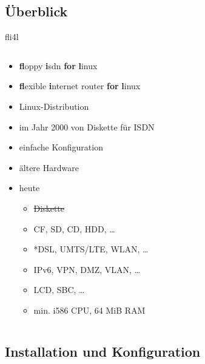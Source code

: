 \documentclass[t]{beamer}
\makeatletter
\newcommand{\soutthick}[1]{%
    \renewcommand{\ULthickness}{1pt}%
        \sout{#1}%
    \renewcommand{\ULthickness}{.4pt}%
}
\newcommand{\strong}[1]{\@strong{#1}}
\newcommand{\@@strong}[1]{\textbf{\let\@strong\@@@strong#1}}
\newcommand{\@@@strong}[1]{\textnormal{\let\@strong\@@strong#1}}
\let\@strong\@@strong
\makeatother
\begin{document}
\subsection{Überblick}

\begin{frame}{fli4l}
    \begin{columns}[T,onlytextwidth]
        \begin{column}{0.6\textwidth}
            \begin{itemize}
                \item \strong{fl}oppy \strong{i}sdn \strong{for} \strong{l}inux
                \item \strong{fl}exible \strong{i}nternet router \strong{for}
                    \strong {l}inux
                \item<2-> Linux-Distribution
                \item<2-> im Jahr 2000 von Diskette für ISDN
                \item<2-> einfache Konfiguration
                \item<2-> ältere Hardware
                \item<3-> heute
                    \begin{itemize}
                        \item \soutthick{Diskette}
                        \item CF, SD, CD, HDD, …
                        \item *DSL, UMTS/LTE, WLAN, …
                        \item IPv6, VPN, DMZ, VLAN, …
                        \item LCD, SBC, …
                        \item min. i586 CPU, 64 MiB RAM
                    \end{itemize}
            \end{itemize}
        \end{column}
        \begin{column}{0.37\textwidth}
            \begin{figure}
                
            \end{figure}
        \end{column}
    \end{columns}
\end{frame}

\subsection{Installation und Konfiguration}
\end{document}
